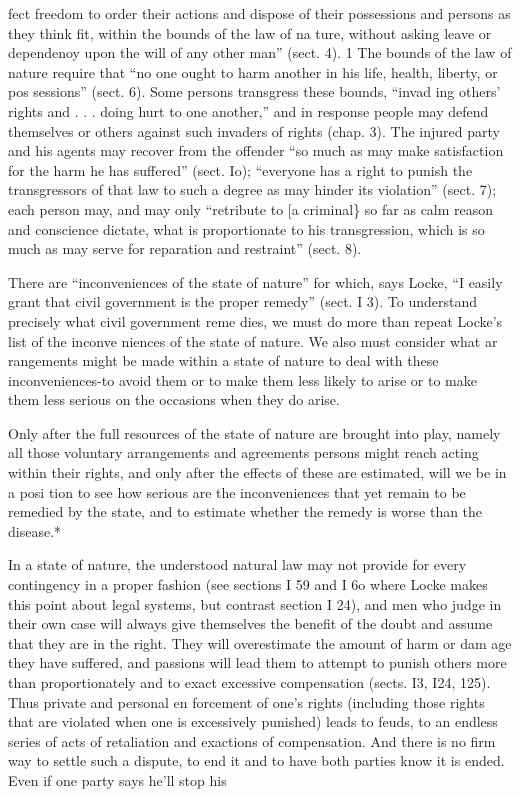 \documentclass[11pt,openany]{book}
\begin{document}
fect freedom to order their actions and dispose of their possessions and persons as they think fit, within the bounds of the law of na ture, without asking leave or dependenoy upon the will of any other man'' (sect. 4). 1 The bounds of the law of nature require that ``no one ought to harm another in his life, health, liberty, or pos sessions'' (sect. 6). Some persons transgress these bounds, ``invad ing others' rights and . . . doing hurt to one another,'' and in response people may defend themselves or others against such invaders of rights (chap. 3). The injured party and his agents may recover from the offender ``so much as may make satisfaction for the harm he has suffered'' (sect. Io); ``everyone has a right to punish the transgressors of that law to such a degree as may hinder its violation'' (sect. 7); each person may, and may only ``retribute to [a criminal\} so far as calm reason and conscience dictate, what is proportionate to his transgression, which is so much as may serve for reparation and restraint'' (sect. 8). 

There are ``inconveniences of the state of nature'' for which, says Locke, ``I easily grant that civil government is the proper remedy'' (sect. I 3). To understand precisely what civil government reme dies, we must do more than repeat Locke's list of the inconve niences of the state of nature. We also must consider what ar rangements might be made within a state of nature to deal with these inconveniences-to avoid them or to make them less likely to arise or to make them less serious on the occasions when they do arise. 

Only after the full resources of the state of nature are brought into play, namely all those voluntary arrangements and agreements persons might reach acting within their rights, and only after the effects of these are estimated, will we be in a posi tion to see how serious are the inconveniences that yet remain to be remedied by the state, and to estimate whether the remedy is worse than the disease.* 

In a state of nature, the understood natural law may not provide for every contingency in a proper fashion (see sections I 59 and I 6o where Locke makes this point about legal systems, but contrast section I 24), and men who judge in their own case will always give themselves the benefit of the doubt and assume that they are in the right. They will overestimate the amount of harm or dam age they have suffered, and passions will lead them to attempt to punish others more than proportionately and to exact excessive compensation (sects. I3, I24, 125). Thus private and personal en forcement of one's rights (including those rights that are violated when one is excessively punished) leads to feuds, to an endless series of acts of retaliation and exactions of compensation. And there is no firm way to settle such a dispute, to end it and to have both parties know it is ended. Even if one party says he'll stop his 
\end{document}
